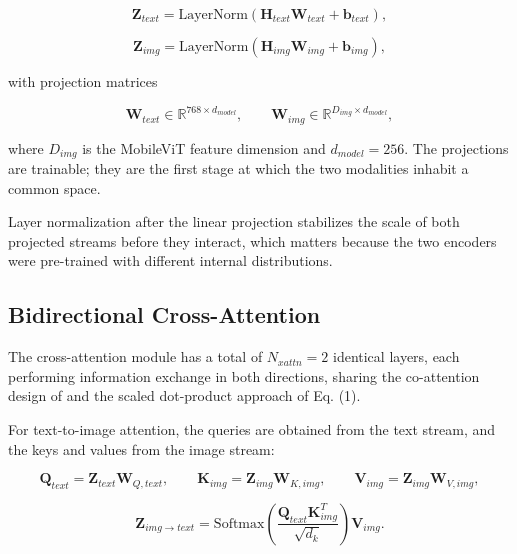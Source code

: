 \documentclass[10pt,twoside]{article}
\begin{document}
\begin{equation}\label{eq:9}
\mathbf{Z}_{text} = \text{LayerNorm}\!\left( \mathbf{H}_{text} \mathbf{W}_{text} + \mathbf{b}_{text} \right),
\end{equation}

\begin{equation}\label{eq:10}
\mathbf{Z}_{img} = \text{LayerNorm}\!\left( \mathbf{H}_{img} \mathbf{W}_{img} + \mathbf{b}_{img} \right),
\end{equation}

with projection matrices

\begin{equation}\label{eq:11}
\mathbf{W}_{text} \in \mathbb{R}^{768 \times d_{model}}, \qquad \mathbf{W}_{img} \in \mathbb{R}^{D_{img} \times d_{model}},
\end{equation}

where $D_{img}$ is the MobileViT feature dimension and $d_{model} = 256$. The projections are trainable; they are the first stage at which the two modalities inhabit a common space.

Layer normalization after the linear projection stabilizes the scale of both projected streams before they interact, which matters because the two encoders were pre-trained with different internal distributions.

\subsection{Bidirectional Cross-Attention}\label{sec:5.5}

The cross-attention module has a total of $N_{xattn} = 2$ identical layers, each performing information exchange in both directions, sharing the co-attention design of \citep{lu2019vilbert} and the scaled dot-product approach of Eq. (1).

For text-to-image attention, the queries are obtained from the text stream, and the keys and values from the image stream:

\begin{equation}\label{eq:12}
\mathbf{Q}_{text} = \mathbf{Z}_{text} \mathbf{W}_{Q,text}, \qquad \mathbf{K}_{img} = \mathbf{Z}_{img} \mathbf{W}_{K,img}, \qquad \mathbf{V}_{img} = \mathbf{Z}_{img} \mathbf{W}_{V,img},
\end{equation}

\begin{equation}\label{eq:13}
\mathbf{Z}_{img \rightarrow text} = \text{Softmax}\!\left( \frac{\mathbf{Q}_{text} \mathbf{K}_{img}^{T}}{\sqrt{d_k}} \right) \mathbf{V}_{img}.
\end{equation}
\end{document}
